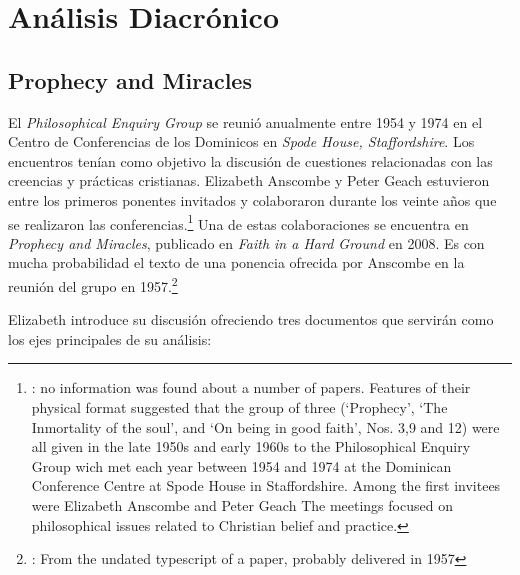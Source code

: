 \section{Análisis Diacrónico}

\subsection{Prophecy and Miracles}

El \emph{Philosophical Enquiry Group} se reunió anualmente entre 1954 y 1974 en
el Centro de Conferencias de los Dominicos en \emph{Spode House, Staffordshire}.
Los encuentros tenían como objetivo la discusión de cuestiones relacionadas con
las creencias y prácticas cristianas. Elizabeth Anscombe y Peter Geach
estuvieron entre los primeros ponentes invitados y colaboraron durante los
veinte años que se realizaron las
conferencias.\footnote{\cite[Cf.~][x]{anscombe2008faith}: \textelp{} no
  information was found about a number of papers. Features of their physical
  format suggested that the group of three (`Prophecy', `The Inmortality of the
  soul', and `On being in good faith', Nos. 3,9 and 12) were all given in the
  late 1950s and early 1960s to the Philosophical Enquiry Group wich met each
  year between 1954 and 1974 at the Dominican Conference Centre at Spode House
  in Staffordshire. \textelp{} Among the first invitees were Elizabeth Anscombe
  and Peter Geach \textelp{} The meetings focused on philosophical issues
  related to Christian belief and practice.} Una de estas colaboraciones se
encuentra en \emph{Prophecy and Miracles}, publicado en \emph{Faith in a Hard
  Ground} en 2008. Es con mucha probabilidad el texto de una ponencia ofrecida
por Anscombe en la reunión del grupo en 1957.\footnote{\cite[Cf.~][nota a pie de
  página 20]{anscombe2008faith:prophandmi}: From the undated typescript of a
  paper, probably delivered in 1957}

Elizabeth introduce su discusión ofreciendo tres documentos que servirán como
los ejes principales de su análisis:

